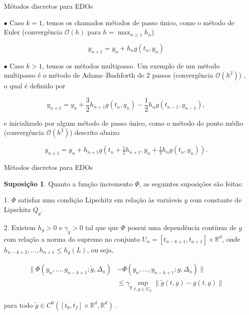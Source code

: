 \documentclass{beamer}
\newcommand{\R}{\mathbb{R}}
\theoremstyle{plain}
\theoremstyle{definition}
\newtheorem{assumption}{Suposição}
\begin{document}
\begin{frame}{Métodos discretos para EDOs}

    \small


    \phantom{aa} $\bullet$ Caso $k = 1$, temos os chamados métodos de passo único, como o método de Euler (convergência $\mathcal{O}(h)$ para $h = \max_{n \geq 1} h_n$) 

    \[
        y_{n+1} = y_n + h_n g(t_n, y_n)
    \]

    \phantom{aa} $\bullet$ Caso $k > 1$, temos os métodos multipasso. Um exemplo de um método multipasso é o método de Adams–Bashforth de 2 passos (convergência $\mathcal{O}(h^2)$) , o qual é definido por 


    \[
        y_{n+1} = y_{n} + \frac{3}{2} h_{n+1} g(t_{n},y_{n}) - \frac{1}{2} h_{n}g(t_{n-1},y_{n-1}),
    \]

    \noindent
    e  inicializado por algum método de passo único, como o método do ponto médio (convergência $\mathcal{O}(h^2)$) descrito abaixo

    \[
        y_{n+1}=y_{n}+h_{n+1}g\left(t_{n}+{\tfrac {1}{2}}h_{n+1},y_{n}+{\tfrac{1}{2}}h_{n}g(t_{n},y_{n})\right).
    \]
\end{frame}


\begin{frame}{Métodos discretos para EDOs}
    \begin{assumption}
        \label{chap3:assumption:1:Phi}
        \small
        Quanto a função incremento $\Phi$, as seguintes suposições são feitas:

        \phantom{aa} 1. $\Phi$ satisfaz uma condição Lipschitz em relação às variáveis $y$ com constante de Lipschitz $Q_g$.


        \phantom{aa} 2. Existem $h_g>0$ e $\gamma_g > 0$  tal que que $\Phi$ possui uma dependência contínua de $g$ com relação a norma do supremo no conjunto $U_n = [t_{n-k+1}, t_{n+1}] \times \R^d$, onde $h_{n - k +2 }, \dots, h_{n+1} \leq h_g (L)$, ou seja, 

        \scriptsize
            \begin{equation}
                \begin{split}
                    \| \Phi(y_n, ..., y_{n - k + 1}; \tilde{g}, \Delta_n)  &- \Phi(y_n, ..., y_{n - k + 1}; g, \Delta_n) \| \\
                                                                           &\leq \gamma_g \sup_{t, y \in U_n} \| \tilde{g}(t, y) - g(t, y) \|
                \end{split}
                \label{chap3:assumption:point_lipschitz_Phi}
            \end{equation}

        para todo $\tilde{g} \in C^0([t_0, t_f] \times \R^d, \R^d)$ . 

    \end{assumption}

\end{frame}
\end{document}

